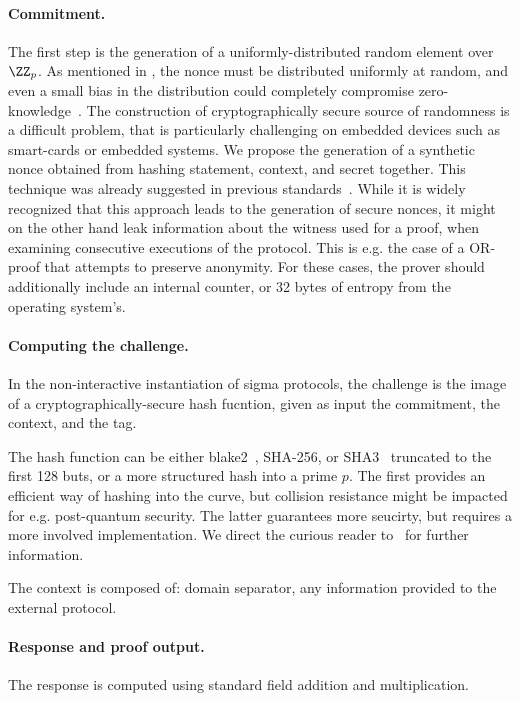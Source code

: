\documentclass[runningheads]{llncs}
\begin{document}

\paragraph{Commitment.} The first step is the generation of a uniformly-distributed random element over $\ZZ_p$. As mentioned in , the nonce must be distributed uniformly at random, and even a small bias in the distribution could completely compromise zero-knowledge~\cite{XX}.
The construction of cryptographically secure source of randomness is a difficult problem, that is particularly challenging on embedded devices such as smart-cards or embedded systems.
We propose the generation of a synthetic nonce obtained from hashing statement, context, and secret together.
This technique was already suggested in previous standards~\cite{rfc6979}.
While it is widely recognized that this approach leads to the generation of secure nonces, it might on the other hand leak information about the witness used for a proof, when examining consecutive executions of the protocol. This is e.g. the case of a OR-proof that attempts to preserve anonymity.
 For these cases, the prover should additionally include an internal counter, or 32 bytes of entropy from the operating system's.


\paragraph{Computing the challenge.} In the non-interactive instantiation of sigma protocols, the challenge is the image of a cryptographically-secure hash fucntion,
given as input the commitment, the context, and the tag.

The hash function can be either blake2~\cite{XX}, SHA-256, or SHA3~\cite{XX} truncated to the first 128 buts, or a more structured hash into a prime $p$.
The first provides an efficient way of hashing into the curve, but collision resistance might be impacted for e.g. post-quantum security.
The latter guarantees more seucirty, but requires a more involved implementation.
We direct the curious reader to~\cite{XX} for further information.

The context is composed of: domain separator, any information provided to the external protocol.

\paragraph{Response and proof output.} The response is computed using standard field addition and multiplication.
\end{document}
